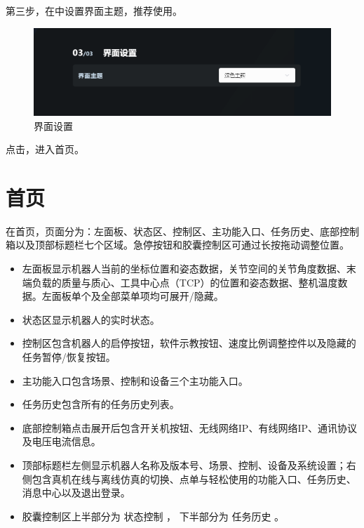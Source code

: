 第三步，在中设置界面主题，推荐使用。

\begin{figure}[ht]
	\centering
	\includegraphics[width=\textwidth]{screen/2-9.png}
	\caption{界面设置}
	\label{fig:界面设置}
\end{figure}

点击，进入\LM 首页。


\section{首页}

在\LM 首页，页面分为：左面板、状态区、控制区、主功能入口、任务历史、底部控制箱以及顶部标题栏七个区域。急停按钮和胶囊控制区可通过长按拖动调整位置。

\begin{itemize}
	\item 左面板显示机器人当前的坐标位置和姿态数据，关节空间的关节角度数据、末端负载的质量与质心、工具中心点（TCP）的位置和姿态数据、整机温度数据。左面板单个及全部菜单项均可展开/隐藏。
	\item 状态区显示机器人的实时状态。 
	\item 控制区包含机器人的启停按钮，软件示教按钮、速度比例调整控件以及隐藏的任务暂停/恢复按钮。 
	\item 主功能入口包含场景、控制和设备三个主功能入口。 
	\item 任务历史包含所有的任务历史列表。 
	\item 底部控制箱点击展开后包含开关机按钮、无线网络IP、有线网络IP、通讯协议及电压电流信息。
	\item 顶部标题栏左侧显示机器人名称及版本号、场景、控制、设备及系统设置；右侧包含真机在线与离线仿真的切换、点单与轻松使用的功能入口、任务历史、消息中心以及退出登录。 
	\item 胶囊控制区上半部分为 状态控制 ， 下半部分为 任务历史 。	
\end{itemize}

